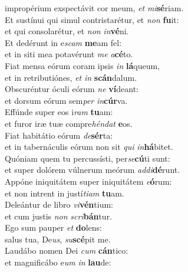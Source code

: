 \evenverse impropérium exspectávit cor meum, \textit{et} \textit{mi}\textbf{sé}riam.\\
\oddverse Et sustínui qui simul contristarétur, et \textit{non} \textbf{fu}it:~\*\\
\oddverse et qui consolarétur, et \textit{non} \textit{in}\textbf{vé}ni.\\
\evenverse Et dedérunt in e\textit{scam} \textbf{me}am fel:~\*\\
\evenverse et in siti mea potavérunt \textit{me} \textit{a}\textbf{cé}to.\\
\oddverse Fiat mensa eórum coram ipsis \textit{in} \textbf{lá}queum,~\*\\
\oddverse et in retributiónes, \textit{et} \textit{in} \textbf{scán}dalum.\\
\evenverse Obscuréntur óculi eórum \textit{ne} \textbf{ví}deant:~\*\\
\evenverse et dorsum eórum sem\textit{per} \textit{in}\textbf{cúr}va.\\
\oddverse Effúnde super eos i\textit{ram} \textbf{tu}am:~\*\\
\oddverse et furor iræ tuæ compre\textit{hén}\textit{dat} \textbf{e}os.\\
\evenverse Fiat habitátio eórum \textit{de}\textbf{sér}ta:~\*\\
\evenverse et in tabernáculis eórum non sit \textit{qui} \textit{in}\textbf{há}bitet.\\
\oddverse Quóniam quem tu percussísti, per\textit{se}\textbf{cú}ti sunt:~\*\\
\oddverse et super dolórem vúlnerum meórum \textit{ad}\textit{di}\textbf{dé}runt.\\
\evenverse Appóne iniquitátem super iniquitátem \textit{e}\textbf{ó}rum:~\*\\
\evenverse et non intrent in justí\textit{ti}\textit{am} \textbf{tu}am.\\
\oddverse Deleántur de libro \textit{vi}\textbf{vén}tium:~\*\\
\oddverse et cum justis \textit{non} \textit{scri}\textbf{bán}tur.\\
\evenverse Ego sum pauper \textit{et} \textbf{do}lens:~\*\\
\evenverse salus tua, De\textit{us}, \textit{su}\textbf{scé}pit me.\\
\oddverse Laudábo nomen Dei \textit{cum} \textbf{cán}tico:~\*\\
\oddverse et magnificábo e\textit{um} \textit{in} \textbf{lau}de:\\
